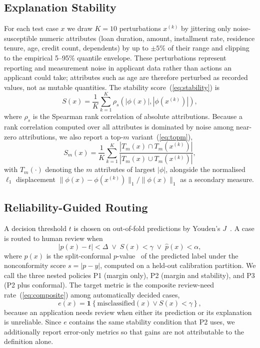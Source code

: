 \documentclass[journal]{IEEEtran}
\begin{document}
\subsection{Explanation Stability}
For each test case $x$ we draw $K=10$ perturbations $x^{(k)}$ by jittering only
noise-susceptible numeric attributes (loan duration, amount, installment rate,
residence tenure, age, credit count, dependents) by up to $\pm 5\%$ of their
range and clipping to the empirical 5--95\% quantile envelope. These
perturbations represent reporting and measurement noise in applicant data
rather than actions an applicant could take; attributes such as age are
therefore perturbed as recorded values, not as mutable quantities. The
stability score~(\ref{eq:stability}) is
\begin{equation}
S(x)=\frac{1}{K}\sum_{k=1}^{K}\rho_s\!\left(|\phi(x)|,
  \left|\phi(x^{(k)})\right|\right),
\label{eq:stability}
\end{equation}
where $\rho_s$ is the Spearman rank correlation of absolute attributions.
Because a rank correlation computed over all attributes is dominated by noise
among near-zero attributions, we also report a top-$m$ variant~(\ref{eq:topm}),
\begin{equation}
S_m(x)=\frac{1}{K}\sum_{k=1}^{K}
  \frac{\left|T_m(x)\cap T_m(x^{(k)})\right|}
       {\left|T_m(x)\cup T_m(x^{(k)})\right|},
\label{eq:topm}
\end{equation}
with $T_m(\cdot)$ denoting the $m$ attributes of largest $|\phi|$, alongside
the normalised $\ell_1$ displacement
$\|\phi(x)-\phi(x^{(k)})\|_1/\|\phi(x)\|_1$ as a secondary measure.

\subsection{Reliability-Guided Routing}
A decision threshold $t$ is chosen on out-of-fold predictions by Youden's
$J$~\cite{youden1950index}. A case is routed to human review when
\begin{equation}
|p(x)-t|<\Delta\;\vee\;S(x)<\gamma\;\vee\;\hat{p}(x)<\alpha,
\label{eq:routing}
\end{equation}
where $\hat{p}(x)$ is the split-conformal $p$-value~\cite{angelopoulos2023conformal}
of the predicted label under the nonconformity score $s=|p-y|$, computed on a
held-out calibration partition. We call the three nested policies P1 (margin
only), P2 (margin and stability), and P3 (P2 plus conformal). The target metric
is the composite review-need rate~(\ref{eq:composite}) among automatically decided cases,
\begin{equation}
e(x)=\mathbf{1}\left\{\mathrm{misclassified}(x)\vee S(x)<\gamma\right\},
\label{eq:composite}
\end{equation}
because an application needs review when either its prediction or its
explanation is unreliable. Since $e$ contains the same stability condition
that P2 uses, we additionally report error-only metrics so that gains are not
attributable to the definition alone.
\end{document}
